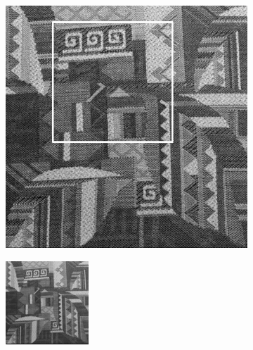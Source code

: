 \begin{figure}[!h]
\begin{subfigure}{0.39\linewidth}
\includegraphics[width=\linewidth]{img/ch5/tex_stage_5.png}
\caption{}
\end{subfigure}
\begin{subfigure}{.19\linewidth}
  \centering
\includegraphics[width=\linewidth]{img/ch5/tex_zoom_out_stage_3.png}\\

\end{subfigure}
\end{figure}
